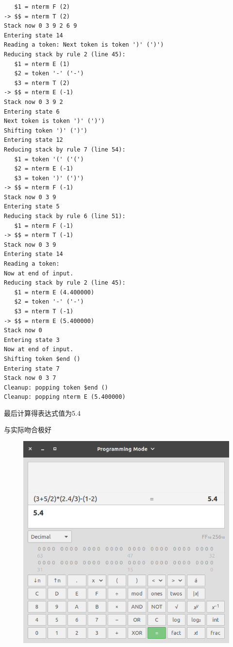 \begin{verbatim}
   $1 = nterm F (2)
-> $$ = nterm T (2)
Stack now 0 3 9 2 6 9
Entering state 14
Reading a token: Next token is token ')' (')')
Reducing stack by rule 2 (line 45):
   $1 = nterm E (1)
   $2 = token '-' ('-')
   $3 = nterm T (2)
-> $$ = nterm E (-1)
Stack now 0 3 9 2
Entering state 6
Next token is token ')' (')')
Shifting token ')' (')')
Entering state 12
Reducing stack by rule 7 (line 54):
   $1 = token '(' ('(')
   $2 = nterm E (-1)
   $3 = token ')' (')')
-> $$ = nterm F (-1)
Stack now 0 3 9
Entering state 5
Reducing stack by rule 6 (line 51):
   $1 = nterm F (-1)
-> $$ = nterm T (-1)
Stack now 0 3 9
Entering state 14
Reading a token:
Now at end of input.
Reducing stack by rule 2 (line 45):
   $1 = nterm E (4.400000)
   $2 = token '-' ('-')
   $3 = nterm T (-1)
-> $$ = nterm E (5.400000)
Stack now 0
Entering state 3
Now at end of input.
Shifting token $end ()
Entering state 7
Stack now 0 3 7
Cleanup: popping token $end ()
Cleanup: popping nterm E (5.400000)
\end{verbatim}

最后计算得表达式值为5.4

与实际吻合极好

\begin{figure}[H]
  \centering
  \includegraphics[scale=0.8]{figures/calc.png}
\end{figure}